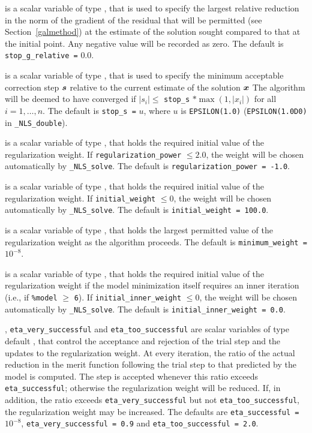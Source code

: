 \documentclass{galahad}
\newcommand{\packagename}{NLS}
\newcommand{\fullpackagename}{\libraryname\_\packagename}
\newcommand{\solver}{{\tt \fullpackagename\_solve}}
\begin{document}
\begin{description}
 is a scalar variable of type \realdp,
that is used to specify the largest relative reduction in the norm of the
gradient of the residual that will be permitted
(see Section~\ref{galmethod}) at the estimate of the solution sought
compared to that at the initial point.
Any negative value will be recorded as zero.
The default is {\tt stop\_g\_relative =} $0.0$.

 is a scalar variable of type \realdp,
that is used to specify the minimum acceptable correction step ${\bm{s}}$
relative to the current estimate of the solution ${\bm{x}}$
The algorithm will be deemed to have converged if $|s_i| \leq$
{\tt stop\_s} $\ast \max( 1, |x_i|)$ for all $i = 1, \ldots, n$.
The default is {\tt stop\_s =} $u$,
where $u$ is {\tt EPSILON(1.0)} ({\tt EPSILON(1.0D0)} in
{\tt \fullpackagename\_double}).

 is a scalar variable of type \realdp,
that holds the required initial value of the regularization weight. If
{\tt regularization\_power} $\leq 2.0$, the weight will be chosen automatically
by \solver.
The default is {\tt regularization\_power = -1.0}.

 is a scalar variable of type \realdp, that holds
the required initial value of the regularization weight. If
{\tt initial\_weight} $\leq 0$, the weight will be chosen automatically
by \solver.
The default is {\tt initial\_weight = 100.0}.

 is a scalar variable of type \realdp, that holds
the largest permitted value of the regularization weight as the algorithm
proceeds.
The default is {\tt minimum\_weight =} $10^{-8}$.

 is a scalar variable of type \realdp,
that holds the required initial value of the regularization weight if
the model minimization itself requires an inner iteration
(i.e., if {\tt \%model} $\geq$ {\tt 6}).
If {\tt initial\_inner\_weight} $\leq 0$, the weight will be chosen
automatically by \solver.
The default is {\tt initial\_inner\_weight = 0.0}.

, {\tt eta\_very\_successful}
and {\tt eta\_too\_successful}
are scalar variables of type default
\realdp, that control the acceptance and rejection of the trial step
and the updates to the regularization weight.
At every iteration, the ratio of the actual reduction in the merit function
following the trial step to that predicted by the model is computed.
The step is accepted whenever this ratio exceeds {\tt eta\_successful};
otherwise the regularization weight will be reduced.
If, in addition, the ratio exceeds {\tt eta\_very\_successful} but not
{\tt eta\_too\_successful}, the regularization weight may be increased.
The defaults are
{\tt eta\_successful =} $10^{-8}$,
{\tt eta\_very\_successful = 0.9} and
{\tt eta\_too\_successful = 2.0}.


\end{description}
\end{document}
